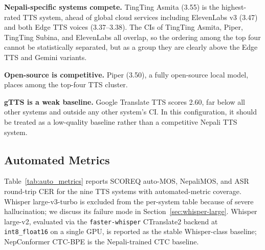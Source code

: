 \documentclass[11pt]{article}
\begin{document}
\textbf{Nepali-specific systems compete.} TingTing Asmita (3.55) is the highest-rated TTS system, ahead of global cloud services including ElevenLabs v3 (3.47) and both Edge TTS voices (3.37--3.38). The CIs of TingTing Asmita, Piper, TingTing Subina, and ElevenLabs all overlap, so the ordering among the top four cannot be statistically separated, but as a group they are clearly above the Edge TTS and Gemini variants.

\textbf{Open-source is competitive.} Piper (3.50), a fully open-source local model, places among the top-four TTS cluster.

\textbf{gTTS is a weak baseline.} Google Translate TTS scores 2.60, far below all other systems and outside any other system's CI. In this configuration, it should be treated as a low-quality baseline rather than a competitive Nepali TTS system.

\subsection{Automated Metrics}

Table~\ref{tab:auto_metrics} reports SCOREQ auto-MOS, NepaliMOS, and ASR round-trip CER for the nine TTS systems with automated-metric coverage. Whisper large-v3-turbo is excluded from the per-system table because of severe hallucination; we discuss its failure mode in Section~\ref{sec:whisper-large}. Whisper large-v2, evaluated via the \texttt{faster-whisper} CTranslate2 backend at \texttt{int8\_float16} on a single GPU, is reported as the stable Whisper-class baseline; NepConformer CTC-BPE is the Nepali-trained CTC baseline.
\end{document}
